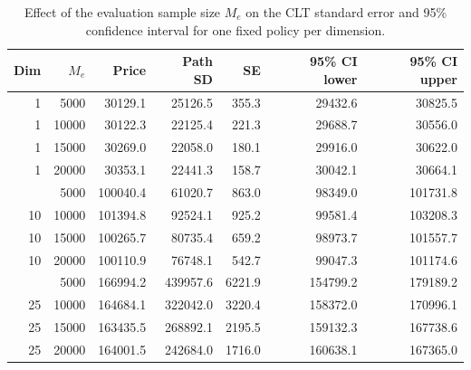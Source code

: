 \begin{table}

\caption{\label{tab:evaluation_sample_size}Effect of the evaluation sample size $M_e$ on the CLT standard error and 95\% confidence interval for one fixed policy per dimension.}
\footnotesize
\setlength{\tabcolsep}{4pt}
\centering
\begin{tabular}[t]{rrrrrrr}
\toprule
Dim & $M_e$ & Price & Path SD & SE & 95\% CI lower & 95\% CI upper\\
\midrule
1 & 5000 & 30129.1 & 25126.5 & 355.3 & 29432.6 & 30825.5\\
1 & 10000 & 30122.3 & 22125.4 & 221.3 & 29688.7 & 30556.0\\
1 & 15000 & 30269.0 & 22058.0 & 180.1 & 29916.0 & 30622.0\\
1 & 20000 & 30353.1 & 22441.3 & 158.7 & 30042.1 & 30664.1\\
\addlinespace
10 & 5000 & 100040.4 & 61020.7 & 863.0 & 98349.0 & 101731.8\\
10 & 10000 & 101394.8 & 92524.1 & 925.2 & 99581.4 & 103208.3\\
10 & 15000 & 100265.7 & 80735.4 & 659.2 & 98973.7 & 101557.7\\
10 & 20000 & 100110.9 & 76748.1 & 542.7 & 99047.3 & 101174.6\\
\addlinespace
25 & 5000 & 166994.2 & 439957.6 & 6221.9 & 154799.2 & 179189.2\\
25 & 10000 & 164684.1 & 322042.0 & 3220.4 & 158372.0 & 170996.1\\
25 & 15000 & 163435.5 & 268892.1 & 2195.5 & 159132.3 & 167738.6\\
25 & 20000 & 164001.5 & 242684.0 & 1716.0 & 160638.1 & 167365.0\\
\bottomrule
\end{tabular}
\end{table}
